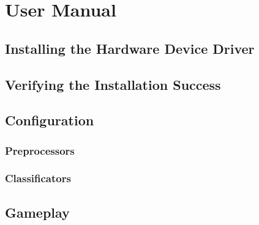 \chapter{User Manual}
\section{Installing the Hardware Device Driver}
\section{Verifying the Installation Success}
\section{Configuration}
\subsection{Preprocessors}
\subsection{Classificators}
\section{Gameplay}